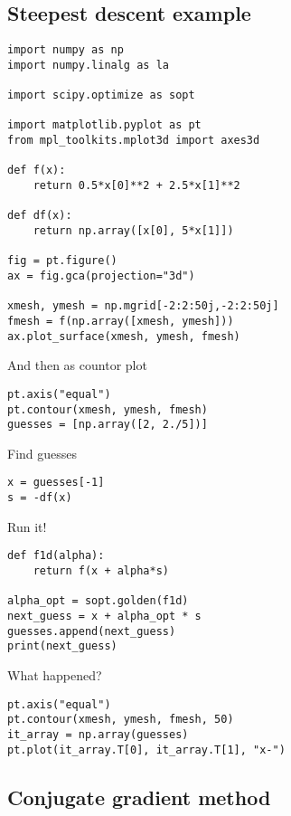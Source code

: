 \documentclass[%
oneside,                 %
final,                   %
10pt]{article}
\begin{document}
\subsection*{Steepest descent example}

\begin{verbatim}
import numpy as np
import numpy.linalg as la

import scipy.optimize as sopt

import matplotlib.pyplot as pt
from mpl_toolkits.mplot3d import axes3d

def f(x):
    return 0.5*x[0]**2 + 2.5*x[1]**2

def df(x):
    return np.array([x[0], 5*x[1]])

fig = pt.figure()
ax = fig.gca(projection="3d")

xmesh, ymesh = np.mgrid[-2:2:50j,-2:2:50j]
fmesh = f(np.array([xmesh, ymesh]))
ax.plot_surface(xmesh, ymesh, fmesh)
\end{verbatim}
And then as countor plot
\begin{verbatim}
pt.axis("equal")
pt.contour(xmesh, ymesh, fmesh)
guesses = [np.array([2, 2./5])]
\end{verbatim}
Find guesses
\begin{verbatim}
x = guesses[-1]
s = -df(x)
\end{verbatim}
Run it!
\begin{verbatim}
def f1d(alpha):
    return f(x + alpha*s)

alpha_opt = sopt.golden(f1d)
next_guess = x + alpha_opt * s
guesses.append(next_guess)
print(next_guess)
\end{verbatim}
What happened?
\begin{verbatim}
pt.axis("equal")
pt.contour(xmesh, ymesh, fmesh, 50)
it_array = np.array(guesses)
pt.plot(it_array.T[0], it_array.T[1], "x-")
\end{verbatim}

\subsection*{Conjugate gradient method}
\end{document}
